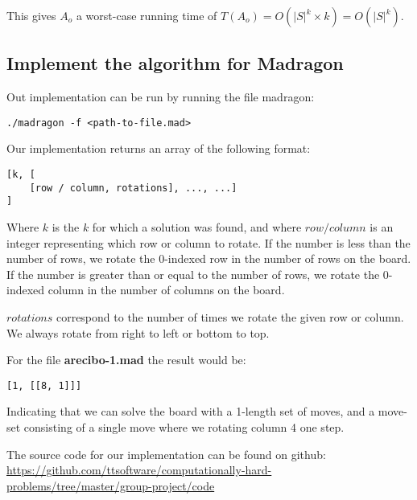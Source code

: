 \documentclass[12pt]{article}
\begin{document}
This gives $A_o$ a worst-case running time of $T(A_o) = O(|S|^k \times k) = O(|S|^k)$.

\subsection{Implement the algorithm for Madragon}
\label{sub:Implement the algorithm for Madragon}

Out implementation can be run by running the file madragon:

\begin{lstlisting}
./madragon -f <path-to-file.mad>
\end{lstlisting}

Our implementation returns an array of the following format:

\begin{lstlisting}
[k, [
    [row / column, rotations], ..., ...]
]
\end{lstlisting}

Where $k$ is the $k$ for which a solution was found, and where $row / column$ is an integer representing which row or column to rotate.
If the number is less than the number of rows, we rotate the 0-indexed row in the number of rows on the board.
If the number is greater than or equal to the number of rows, we rotate the 0-indexed column in the number of columns on the board.

$rotations$ correspond to the number of times we rotate the given row or column. We always rotate from right to left or bottom to top.

For the file \textbf{arecibo-1.mad} the result would be:

\begin{lstlisting}
[1, [[8, 1]]]
\end{lstlisting}

Indicating that we can solve the board with a 1-length set of moves, and a move-set consisting of a single move where we rotating column 4 one step.

The source code for our implementation can be found on github: \url{https://github.com/ttsoftware/computationally-hard-problems/tree/master/group-project/code}
\end{document}
